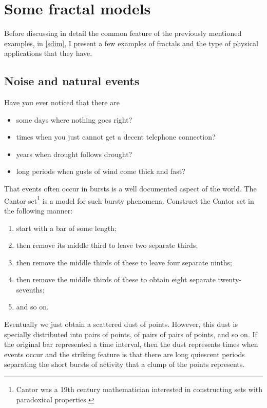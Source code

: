 
\section{Some fractal models}
\label{sfrac}

Before discussing in detail the common feature of the previously 
mentioned examples, in \cref{sdim}, I present a few examples of 
fractals and the type of physical applications that they have.

\subsection{Noise and natural events}
\label{ssnoise}

Have you ever noticed that there are    
\begin{itemize}
	\item  some days where nothing goes right?

	\item  times when you just cannot get a decent telephone connection?

	\item  years when drought follows drought?

	\item  long periods when gusts of wind come thick and fast?
\end{itemize}
That events often occur in bursts 
is a well documented aspect of the world.  The Cantor 
set\footnote{Cantor was a 19th century mathematician interested in 
constructing sets with paradoxical properties.} is a model 
for such bursty phenomena.  Construct the Cantor set in the following 
manner:
\begin{enumerate}
	\item  start with a bar of some length; 

	\item  then remove its middle third to leave two separate thirds; 

	\item  then remove the middle thirds of these to leave four separate ninths; 

	\item  then remove the middle thirds of these to 
	obtain eight separate twenty-sevenths; 

	\item  and so on.  
\end{enumerate}
Eventually we just 
obtain a scattered dust of points.  However, this dust is specially 
distributed into pairs of points, of pairs of pairs of points, and so 
on.  If the original bar represented a time interval, then the dust 
represents times when events occur and the striking feature is that 
there are long quiescent periods separating the short bursts of 
activity that a clump of the points represents.

